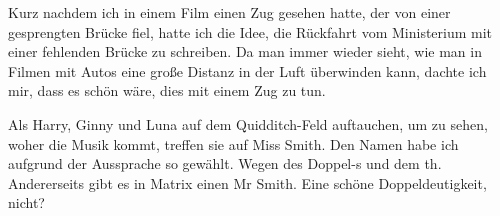 \begin{kommentar}
Kurz nachdem ich in einem Film einen Zug gesehen hatte, der von einer gesprengten Brücke fiel, hatte ich die Idee, die Rückfahrt vom Ministerium mit einer fehlenden Brücke zu schreiben. Da man immer wieder sieht, wie man in Filmen mit Autos eine große Distanz in der Luft überwinden kann, dachte ich mir, dass es schön wäre, dies mit einem Zug zu tun.
\end{kommentar}

\begin{kommentar}
Als Harry, Ginny und Luna auf dem Quidditch-Feld auftauchen, um zu sehen, woher die Musik kommt, treffen sie auf Miss Smith. Den Namen habe ich aufgrund der Aussprache so gewählt. Wegen des Doppel-s und dem th. Andererseits gibt es in Matrix einen Mr Smith. Eine schöne Doppeldeutigkeit, nicht?
\end{kommentar}
